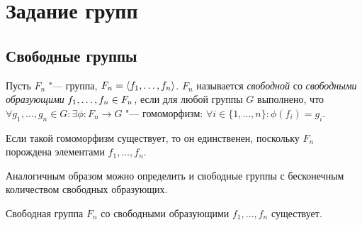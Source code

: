 \section{Задание групп}

\subsection{Свободные группы}

\begin{definition}
	Пусть $F_n$ "--- группа, $F_n = \langle f_1, \dotsc, f_n\rangle$. $F_n$ называется \textit{свободной} со \textit{свободными образующими} $f_1, \dotsc, f_n \hm\in F_n$, если для любой группы $G$ выполнено, что $\forall g_1, \dotsc, g_n \in G: \exists \phi: F_n \to G$ "--- гомоморфизм: $\forall i \in \{1, \dotsc, n\}: \phi(f_i) = g_i$.
\end{definition}

\begin{note}
	Если такой гомоморфизм существует, то он единственен, поскольку $F_n$ порождена элементами $f_1, \dotsc, f_n$.
\end{note}

\begin{note}
	Аналогичным образом можно определить и свободные группы с бесконечным количеством свободных образующих.
\end{note}

\begin{theorem}
	Свободная группа $F_n$ со свободными образующими $f_1, \dotsc, f_n$ существует.
\end{theorem}

